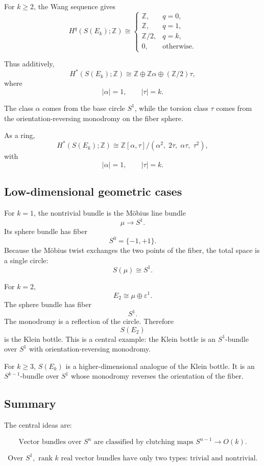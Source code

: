 \documentclass[12pt,a4paper]{article}
\theoremstyle{notespace}
\begin{document}
For \(k\geq 2\), the Wang sequence gives
\[
H^q(S(E_k);\mathbb{Z})
\cong
\begin{cases}
	\mathbb{Z}, & q=0,\\[2mm]
	\mathbb{Z}, & q=1,\\[2mm]
	\mathbb{Z}/2, & q=k,\\[2mm]
	0, & \text{otherwise}.
\end{cases}
\]

Thus additively,
\[
H^*(S(E_k);\mathbb{Z})
\cong
\mathbb{Z}
\oplus
\mathbb{Z}\alpha
\oplus
(\mathbb{Z}/2)\tau,
\]
where
\[
|\alpha|=1,
\qquad
|\tau|=k.
\]

The class \(\alpha\) comes from the base circle \(S^1\), while the torsion class \(\tau\) comes from the orientation-reversing monodromy on the fiber sphere.

As a ring,
\[
H^*(S(E_k);\mathbb{Z})
\cong
\mathbb{Z}[\alpha,\tau]
\big/
(\alpha^2,\;2\tau,\;\alpha\tau,\;\tau^2),
\]
with
\[
|\alpha|=1,
\qquad
|\tau|=k.
\]

\subsection{Low-dimensional geometric cases}

For \(k=1\), the nontrivial bundle is the Möbius line bundle
\[
\mu\to S^1.
\]
Its sphere bundle has fiber
\[
S^0=\{-1,+1\}.
\]
Because the Möbius twist exchanges the two points of the fiber, the total space is a single circle:
\[
S(\mu)\cong S^1.
\]

For \(k=2\),
\[
E_2\cong \mu\oplus \varepsilon^1.
\]
The sphere bundle has fiber
\[
S^1.
\]
The monodromy is a reflection of the circle. Therefore
\[
S(E_2)
\]
is the Klein bottle. This is a central example: the Klein bottle is an \(S^1\)-bundle over \(S^1\) with orientation-reversing monodromy.

For \(k\geq 3\), \(S(E_k)\) is a higher-dimensional analogue of the Klein bottle. It is an \(S^{k-1}\)-bundle over \(S^1\) whose monodromy reverses the orientation of the fiber.

\subsection{Summary}

The central ideas are:

\[
\boxed{
	\text{Vector bundles over }S^n
	\text{ are classified by clutching maps }
	S^{n-1}\to O(k).
}
\]

\[
\boxed{
	\text{Over }S^1,\text{ rank }k\text{ real vector bundles have only two types:
		trivial and nontrivial.}
}
\]
\end{document}
